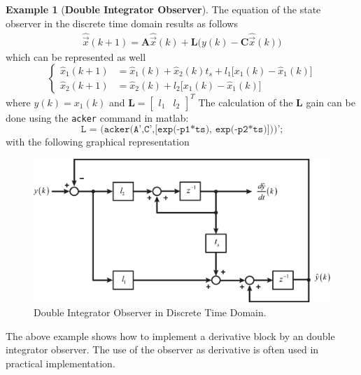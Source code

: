 \documentclass[11pt,a4paper,oneside]{book}
\numberwithin{equation}{section}
\theoremstyle{it}
\theoremstyle{definition}
\newtheorem{example}{Example}[chapter]
\begin{document}
\begin{example}[\textbf{Double Integrator Observer}]
The equation of the state observer in the discrete time domain results as 
follows
\begin{equation}\label{DoubleIntegratorObserver_eq7}
	\begin{aligned}
		{\hat{\vec{x}}}(k+1)={\mathbf{A}}\hat{\vec{x}}(k)+\mathbf{L}\Big(y(k)-\mathbf{C}\hat{\vec{x}}(k)\Big)
	\end{aligned}
\end{equation}
which can be represented as well
\begin{equation}\label{DoubleIntegratorObserver_eq8}
	\left\lbrace \begin{aligned}
		{\hat{x}}_1(k+1) & = \hat{x}_1(k) + \hat{x}_2(k)t_s + l_1\Big[x_1(k) 
		- \hat{x}_1(k)\Big] \\[6pt]
		{\hat{x}}_2(k+1) & = \hat{x}_2(k) + l_2\Big[x_1(k) - \hat{x}_1(k) 
		\Big]
	\end{aligned}\right. 
\end{equation}
where $y(k) = x_1(k)$ and $\mathbf{L}=\begin{bmatrix} l_1&l_2 
\end{bmatrix}^T$
The calculation of the $\mathbf{L}$ gain can be done using the \texttt{acker} 
command in matlab: 
$$\texttt{L = (acker(A',C',[exp(-p1*ts), exp(-p2*ts)]))';}$$
with the following graphical representation
\begin{figure}[H]
	\centering
	\includegraphics[width = 340pt, keepaspectratio] 
	{figures/double_integrator_observer_dt.eps}
	\captionsetup{width=0.5\textwidth, font=small}		
	\caption{Double Integrator Observer in Discrete Time Domain.}
	\label{}
\end{figure}
The above example shows how to implement a derivative block by an double 
integrator observer. The use of the observer as derivative is often used in 
practical implementation.


\end{example}
\end{document}
